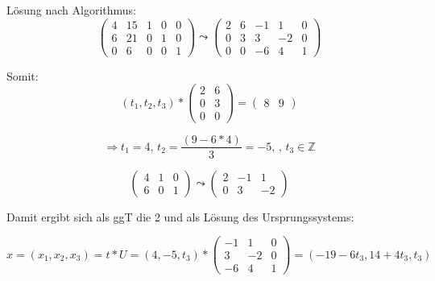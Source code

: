 Lösung nach Algorithmus:
\[\left(
\begin{array}{cc|ccc}
  4 & 15 & 1 & 0 & 0    \\
  6 & 21 & 0 & 1 & 0    \\
  0 & 6  & 0 & 0 & 1%
\end{array}%
\right) \leadsto \left(
\begin{array}{cc|ccc}
  2 & 6 & -1 & 1  & 0    \\
  0 & 3 & 3  & -2 & 0    \\
  0 & 0 & -6 & 4  & 1%
\end{array}%
\right)\]

Somit:
\[\left(
t_1, t_2, t_3
\right) *
\left(
\begin{array}{cc}
  2 & 6    \\
  0 & 3    \\
  0 & 0%
\end{array}
\right)
=
\left(
\begin{array}{cc}
  8 & 9
\end{array}
\right)\]

\[\Rightarrow t_1 = 4 \text{, } t_2 = \frac{(9-6*4)}{3} = -5 \text{, } \text{, }t_3 \in \mathbb{Z}\]

\[\left(
\begin{array}{c|cc}
  4 & 1 & 0    \\
  6 & 0 & 1%
\end{array}
\right) \leadsto \left(
\begin{array}{c|cc}
  2 & -1 & 1     \\
  0 & 3  & -2%
\end{array}
\right)\]

Damit ergibt sich als ggT die 2 und als Lösung des Ursprungssystems:

\[x = (x_1, x_2, x_3) = t * U =
(4,-5,t_3) *
\left(
\begin{array}{ccc}
  -1 & 1  & 0 \\
  3  & -2 & 0 \\
  -6 & 4  & 1
\end{array}
\right)
= (-19-6t_3, 14+4t_3, t_3)\]


